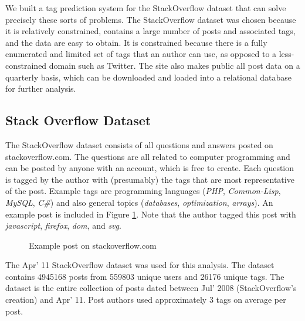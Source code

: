\documentclass[10pt,letterpaper]{article}
\begin{document}
We built a tag prediction system for the StackOverflow dataset that can solve precisely these sorts of problems.
The StackOverflow dataset was chosen because it is relatively constrained, contains a large number of posts and associated tags, and the data are easy to obtain.
It is constrained because there is a fully enumerated and limited set of tags that an author can use, as opposed to a less-constrained domain such as Twitter.
The site also makes public all post data on a quarterly basis, which can be downloaded and loaded into a relational database for further analysis.

\subsection{Stack Overflow Dataset}

The StackOverflow dataset consists of all questions and answers posted on stackoverflow.com.
The questions are all related to computer programming and can be posted by anyone with an account, which is free to create.
Each question is tagged by the author with (presumably) the tags that are most representative of the post.
Example tags are programming languages (\emph{PHP}, \emph{Common-Lisp}, \emph{MySQL}, \emph{C\#}) and also general topics (\emph{databases}, \emph{optimization}, \emph{arrays}).
An example post is included in Figure \ref{fig:examplePost}.
Note that the author tagged this post with \emph{javascript}, \emph{firefox}, \emph{dom}, and \emph{svg}.

\begin{figure}[ht]
  \centering
  \caption{Example post on stackoverflow.com}
  \label{fig:examplePost}
\end{figure}

The Apr' 11 StackOverflow dataset \cite{DataDump2011} was used for this analysis.
The dataset contains \num{4945168} posts from \num{559803} unique users and \num{26176} unique tags.
The dataset is the entire collection of posts dated between Jul' 2008 (StackOverflow's creation) and Apr' 11.
Post authors used approximately 3 tags on average per post. 
\end{document}
